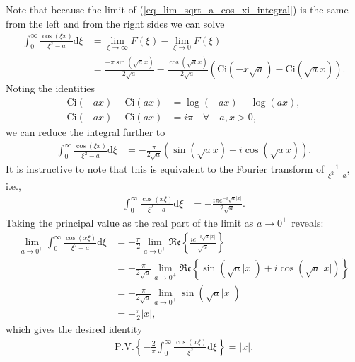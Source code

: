 Note that because the limit of (\ref{eq_lim_sqrt_a_cos_xi_integral}) is the same from the left and
from the right sides we can solve
\begin{align}
	\int_0^{\infty} \! \frac{\cos(\xi x)}{\xi^2 - a} \mathrm{d}\xi &= 
	    \lim_{\xi \to \infty} F(\xi) - \lim_{\xi \to 0} F(\xi) \\
	&= \frac{-\pi \sin\left(\sqrt{a} x\right)}{2 \sqrt{a}} - \frac{\cos\left(\sqrt{a} x\right)}{2\sqrt{a}}\left(\mathrm{Ci}\left(-x\sqrt{a}\right) - \mathrm{Ci}\left(\sqrt{a}x\right)\right).
\end{align}
Noting the identities
\begin{align}
	\mathrm{Ci}(-ax) - \mathrm{Ci}(ax) &= \log(-a x) - \log(a x), \\
	\mathrm{Ci}(-ax) - \mathrm{Ci}(ax) &= i\pi \quad \forall \quad a,x > 0,
\end{align}
we can reduce the integral further to
\begin{align}
	\int_0^{\infty} \! \frac{\cos(\xi x)}{\xi^2 - a} \mathrm{d}\xi &= 
	-\frac{\pi}{2\sqrt{a}}\left(\sin\left(\sqrt{a} x\right) + i\cos\left(\sqrt{a} x\right)\right). \label{eq_cos_integral_complex_form}
\end{align}
It is instructive to note that this is equivalent to the Fourier transform of
$\frac{1}{\xi^2 - a}$, i.e.,
\begin{align}
	\int_0^\infty \! \frac{\cos(x \xi)}{\xi^2 - a} \mathrm{d}\xi
	    &= -\frac{i \pi e^{-i\sqrt{a}|x|}}{2\sqrt{a}}.
\end{align}
Taking the principal value as the real part of the limit as $a \to 0^+$ reveals:
\begin{align}
	\lim_{a \to 0^+} \int_0^{\infty} \frac{\cos(x \xi)}{\xi^2 - a} \mathrm{d}\xi 
	&= -\frac{\pi}{2} \lim_{a \to 0^+} \mathfrak{Re} \left\{ \frac{i e^{-i\sqrt{a}|x|}}{\sqrt{a}}\right\} \\
	&= -\frac{\pi}{2\sqrt{a}} \lim_{a \to 0^+} \mathfrak{Re}  \left\{ \sin\left(\sqrt{a}|x|\right) + i\cos\left(\sqrt{a}|x|\right)\right\} \\
	&= -\frac{\pi}{2\sqrt{a}} \lim_{a \to 0^+} \sin\left(\sqrt{a}|x|\right) \\
	&= -\frac{\pi}{2}|x|,
\end{align}
which gives the desired identity
\begin{align}
	\mathrm{P.V.} \left\{-\frac{2}{\pi} \int_{0}^{\infty} \! \frac{\cos(x \xi)}{\xi^2} \mathrm{d}\xi \right\} = |x|.
\end{align}

